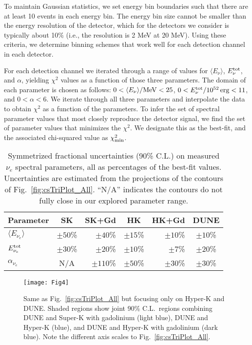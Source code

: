 \documentclass[aps,reprint,superscriptaddress]{revtex4-1}
\begin{document}
To maintain Gaussian statistics, we set energy bin boundaries such that there are at least 10 events in each energy bin.  The energy bin size cannot be smaller than the energy resolution of the detector, which for the detectors we consider is typically about 10\% (i.e., the resolution is 2 MeV at 20 MeV). Using these criteria, we determine binning schemes that work well for each detection channel in each detector.

For each detection channel we iterated through a range of values for $\langle E_{\nu}\rangle$, $E_{\nu}^{\rm tot}$, and $\alpha$, yielding $\chi^{2}$ values as a function of those three parameters. The domain of each parameter is chosen as follows: $0 < \langle E_{\nu}\rangle/ {\rm MeV} < 25$, $0 < E_{\nu}^{\rm tot}/ 10^{52} \, {\rm erg} < 11$, and $0 < \alpha < 6$. We iterate through all three parameters and interpolate the data to obtain $\chi^{2}$ as a function of the parameters. To infer the set of spectral parameter values that most closely reproduce the detector signal, we find the set of parameter values that minimizes the $\chi^{2}$. We designate this as the best-fit, and the associated chi-squared value as $\chi^{2}_{\rm min}$.

\begin{table}
\centering
\begin{tabular}{lcrcrc}
\hline \hline Parameter & SK & SK+Gd & HK & HK+Gd & DUNE \\ \hline
$\langle E_{\nu_e}\rangle$ 	& $\pm50$\% & $\pm40$\% & $\pm15$\% & $\pm10$\% & $\pm10$\% \\
$E_{\nu_e}^{\rm tot}$ 		& $\pm30$\% & $\pm20$\% & $\pm10$\% & $\pm7$\% & $\pm20$\% \\
$\alpha_{\nu_e}$ 			& N/A 	      & $\pm110$\% & $\pm50$\% & $\pm30$\% & $\pm30$\% \\
\hline \hline
\end{tabular}
\caption{Symmetrized fractional uncertainties (90\% C.L.) on measured $\nu_e$ spectral parameters, all as percentages of the best-fit values. Uncertainties are estimated from the projections of the contours of Fig.~\ref{fig:csTriPlot_All}. ``N/A'' indicates the contours do not fully close in our explored parameter range.}
\label{tab:errors}
\end{table}

\begin{figure*}[t]
\centering
\texttt{[image: Fig4]}
\caption{Same as Fig.~\ref{fig:csTriPlot_All} but focusing only on Hyper-K and DUNE. Shaded regions show joint 90\% C.L.~regions combining DUNE and Super-K with gadolinium (light blue), DUNE and Hyper-K (blue), and DUNE and Hyper-K with gadolinium (dark blue). Note the different axis scales to Fig.~\ref{fig:csTriPlot_All}.}
\label{fig:csTriPlot_HK}
\end{figure*}
\end{document}
